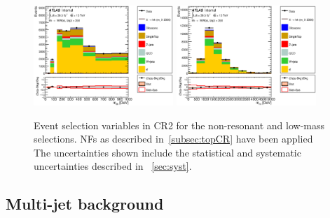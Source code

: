 \begin{figure}[!h]
\begin{center}
\includegraphics*[width=0.47\textwidth] {chapters/dihiggs2/figures/ControlPlots/36ifb_CPUpdated_opt2000_mBBcr_plots_103/C_mBBcr_opt2000ichep_bbpt350_bbMass_regionA_met25d020}
\includegraphics*[width=0.47\textwidth] {chapters/dihiggs2/figures/ControlPlots/36ifb_CPUpdated_opt2000_mBBcr_plots_103/C_mBBcr_opt2000ichep_bbpt350_hhMass_regionA_met25d020}
\caption[Event selection variables in CR2 for the high-mass selection.]{Event selection variables in CR2 for the non-resonant and low-mass selections. \ttbar NFs as described in~\ref{subsec:topCR} have been applied The uncertainties shown include the statistical and systematic uncertainties described in ~\ref{sec:syst}.}
\label{fig:cr2_var}
\end{center}
\end{figure}

\subsection{Multi-jet background}






